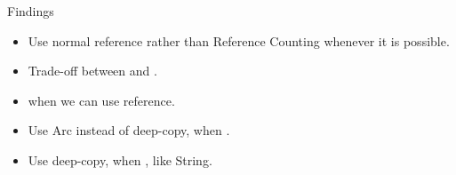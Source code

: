 \documentclass[9pt]{beamer}
\begin{document}
\begin{frame}[fragile]{Findings}
    \begin{itemize}
        \item Use normal reference rather than Reference Counting whenever it is possible.
        \item Trade-off between  and .
        \item {} when we can use reference.
        \item Use Arc instead of deep-copy, when .
        \item Use deep-copy, when , like String.
    \end{itemize}
\end{frame}




\end{document}

